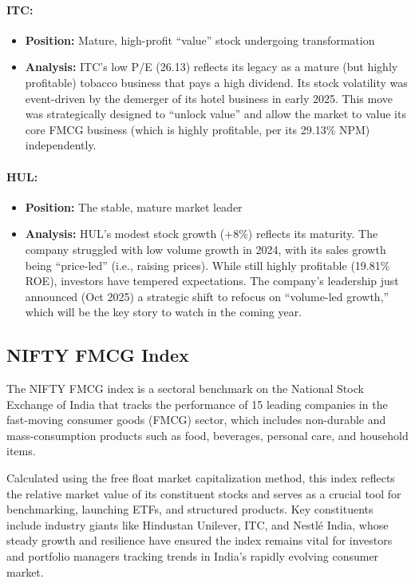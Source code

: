 \documentclass[12pt, a4paper]{report}
\begin{document}
\paragraph{ITC:}
\begin{itemize}
    \item \textbf{Position:} Mature, high-profit ``value'' stock undergoing transformation
    \item \textbf{Analysis:} ITC's low P/E (26.13) reflects its legacy as a mature (but highly profitable) tobacco business that pays a high dividend. Its stock volatility was event-driven by the demerger of its hotel business in early 2025. This move was strategically designed to ``unlock value'' and allow the market to value its core FMCG business (which is highly profitable, per its 29.13\% NPM) independently.
\end{itemize}

\paragraph{HUL:}
\begin{itemize}
    \item \textbf{Position:} The stable, mature market leader
    \item \textbf{Analysis:} HUL's modest stock growth (+8\%) reflects its maturity. The company struggled with low volume growth in 2024, with its sales growth being ``price-led'' (i.e., raising prices). While still highly profitable (19.81\% ROE), investors have tempered expectations. The company's leadership just announced (Oct 2025) a strategic shift to refocus on ``volume-led growth,'' which will be the key story to watch in the coming year.
\end{itemize}

\subsection{NIFTY FMCG Index}

The NIFTY FMCG index is a sectoral benchmark on the National Stock Exchange of India that tracks the performance of 15 leading companies in the fast-moving consumer goods (FMCG) sector, which includes non-durable and mass-consumption products such as food, beverages, personal care, and household items. 

Calculated using the free float market capitalization method, this index reflects the relative market value of its constituent stocks and serves as a crucial tool for benchmarking, launching ETFs, and structured products. Key constituents include industry giants like Hindustan Unilever, ITC, and Nestlé India, whose steady growth and resilience have ensured the index remains vital for investors and portfolio managers tracking trends in India's rapidly evolving consumer market.
\end{document}
